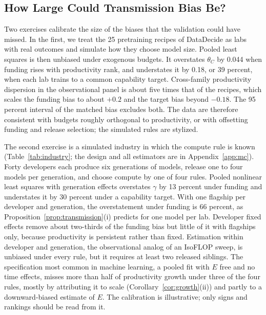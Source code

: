 \documentclass[AER,finalmode]{AEA}
\theoremstyle{definition}
\theoremstyle{remark}
\begin{document}
\subsection{How Large Could Transmission Bias Be?}\label{sec:matched-size}

Two exercises calibrate the size of the biases that the validation could have missed. In the first, we treat the 25
pretraining recipes of DataDecide as labs with real outcomes and simulate how they choose model size. Pooled least
squares is then unbiased under exogenous budgets. It overstates $\theta_C$ by 0.044 when funding rises with
productivity rank, and understates it by 0.18, or 39 percent, when each lab trains to a common capability target.
Cross-family productivity dispersion in the observational panel is about five times that of the recipes, which scales
the funding bias to about $+0.2$ and the target bias beyond $-0.18$. The 95 percent interval of the matched bias
excludes both. The data are therefore consistent with budgets roughly orthogonal to productivity, or with offsetting
funding and release selection; the simulated rules are stylized.



The second exercise is a simulated industry in which the compute rule is known (Table~\ref{tab:industry}; the design
and all estimators are in Appendix~\ref{app:mc}). Forty developers each produce six generations of models, release one
to four models per generation, and choose compute by one of four rules. Pooled nonlinear least squares with generation effects overstates $\gamma$ by 13 percent under
funding and understates it by 30 percent under a capability target. With one flagship per developer and generation,
the overstatement under funding is 66 percent, as Proposition~\ref{prop:transmission}(i) predicts for one model per
lab. Developer fixed effects remove about two-thirds of the funding bias but little of it with flagships only, because
productivity is persistent rather than fixed. Estimation within developer and generation, the observational analog of
an IsoFLOP sweep, is unbiased under every rule, but it requires at least two released siblings. The specification most
common in machine learning, a pooled fit with $E$ free and no time effects, misses more than half of productivity
growth under three of the four rules, mostly by attributing it to scale (Corollary~\ref{cor:growth}(ii)) and partly
to a downward-biased estimate of $E$. The calibration is illustrative; only signs and rankings should be read from
it.
\end{document}
